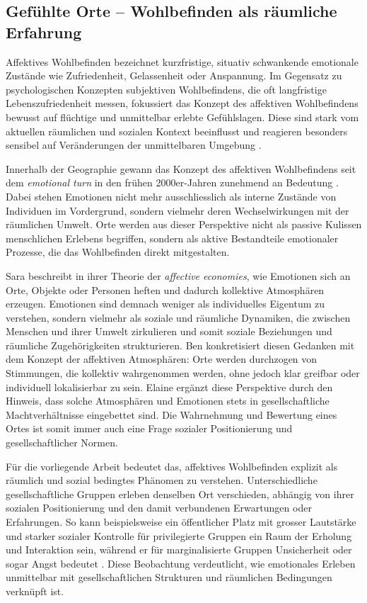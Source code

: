 \subsection{Gefühlte Orte – Wohlbefinden als räumliche Erfahrung}

Affektives Wohlbefinden bezeichnet kurzfristige, situativ schwankende emotionale Zustände wie Zufriedenheit, Gelassenheit oder Anspannung. Im Gegensatz zu psychologischen Konzepten subjektiven Wohlbefindens, die oft langfristige Lebenszufriedenheit messen, fokussiert das Konzept des affektiven Wohlbefindens bewusst auf flüchtige und unmittelbar erlebte Gefühlslagen. Diese sind stark vom aktuellen räumlichen und sozialen Kontext beeinflusst und reagieren besonders sensibel auf Veränderungen der unmittelbaren Umgebung \parencite{dodgeChallengeDefiningWellbeing2012}.

Innerhalb der Geographie gewann das Konzept des affektiven Wohlbefindens seit dem \emph{emotional turn} in den frühen 2000er-Jahren zunehmend an Bedeutung \parencite{hoSocialGeographyIII2024}. Dabei stehen Emotionen nicht mehr ausschliesslich als interne Zustände von Individuen im Vordergrund, sondern vielmehr deren Wechselwirkungen mit der räumlichen Umwelt. Orte werden aus dieser Perspektive nicht als passive Kulissen menschlichen Erlebens begriffen, sondern als aktive Bestandteile emotionaler Prozesse, die das Wohlbefinden direkt mitgestalten.

Sara \textcite{ahmedAffectiveEconomies2004} beschreibt in ihrer Theorie der \emph{affective economies}, wie Emotionen sich an Orte, Objekte oder Personen heften und dadurch kollektive Atmosphären erzeugen. Emotionen sind demnach weniger als individuelles Eigentum zu verstehen, sondern vielmehr als soziale und räumliche Dynamiken, die zwischen Menschen und ihrer Umwelt zirkulieren und somit soziale Beziehungen und räumliche Zugehörigkeiten strukturieren. Ben \textcite{andersonAffectiveAtmospheres2009} konkretisiert diesen Gedanken mit dem Konzept der affektiven Atmosphären: Orte werden durchzogen von Stimmungen, die kollektiv wahrgenommen werden, ohne jedoch klar greifbar oder individuell lokalisierbar zu sein. Elaine \textcite{hoSocialGeographyIII2024} ergänzt diese Perspektive durch den Hinweis, dass solche Atmosphären und Emotionen stets in gesellschaftliche Machtverhältnisse eingebettet sind. Die Wahrnehmung und Bewertung eines Ortes ist somit immer auch eine Frage sozialer Positionierung und gesellschaftlicher Normen.

Für die vorliegende Arbeit bedeutet das, affektives Wohlbefinden explizit als räumlich und sozial bedingtes Phänomen zu verstehen. Unterschiedliche gesellschaftliche Gruppen erleben denselben Ort verschieden, abhängig von ihrer sozialen Positionierung und den damit verbundenen Erwartungen oder Erfahrungen. So kann beispielsweise ein öffentlicher Platz mit grosser Lautstärke und starker sozialer Kontrolle für privilegierte Gruppen ein Raum der Erholung und Interaktion sein, während er für marginalisierte Gruppen Unsicherheit oder sogar Angst bedeutet \parencite{collectiveSafeSpaceReconceptualization2014}. Diese Beobachtung verdeutlicht, wie emotionales Erleben unmittelbar mit gesellschaftlichen Strukturen und räumlichen Bedingungen verknüpft ist.

